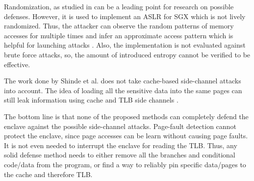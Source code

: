 Randomization, as studied in \cite{sgxshield} can be a leading point for research on possible defenses. However, it is used to implement an ASLR for SGX which is not lively randomized. Thus, the attacker can observe the random patterns of memory accesses for multiple times and infer an approximate access pattern which is helpful for launching attacks \cite{leakycauldron}. Also, the implementation is not evaluated against brute force attacks, so, the amount of introduced entropy cannot be verified to be effective.

The work done by Shinde et al. \cite{pigeonhole} does not take cache-based side-channel attacks into account. The idea of loading all the sensitive data into the same pages can still leak information using cache and TLB side channels \cite{leakycauldron}.

The bottom line is that none of the proposed methods can completely defend the enclave against the possible side-channel attacks. Page-fault detection cannot protect the enclave, since page accesses can be learn without causing page faults. It is not even needed to interrupt the enclave for reading the TLB. Thus, any solid defense method needs to either remove all the branches and conditional code/data from the program, or find a way to reliably pin specific data/pages to the cache and therefore TLB.

